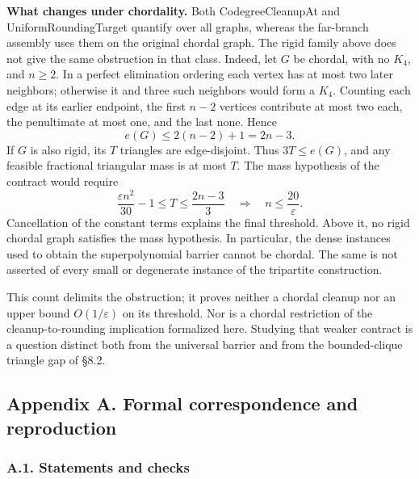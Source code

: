 \documentclass[english,11pt,a4paper]{article}
\newcounter{none}
\begin{document}
\textbf{What changes under chordality.} Both {\ttfamily\small CodegreeClea\discretionary{\hbox{\ensuremath{\hookrightarrow}}}{}{}nupAt} and {\ttfamily\small UniformRound\discretionary{\hbox{\ensuremath{\hookrightarrow}}}{}{}ingTarget} quantify over all graphs, whereas the far-branch assembly uses them on the original chordal graph. The rigid family above does not give the same obstruction in that class. Indeed, let \(G\) be chordal, with no \(K_4\), and \(n\ge2\). In a perfect elimination ordering each vertex has at most two later neighbors; otherwise it and three such neighbors would form a \(K_4\). Counting each edge at its earlier endpoint, the first \(n-2\) vertices contribute at most two each, the penultimate at most one, and the last none. Hence \[
e(G)\le2(n-2)+1=2n-3.
\tag{8.4}
\] If \(G\) is also rigid, its \(T\) triangles are edge-disjoint. Thus \(3T\le e(G)\), and any feasible fractional triangular mass is at most \(T\). The mass hypothesis of the contract would require \[
\frac{\varepsilon n^2}{30}-1
\le T\le\frac{2n-3}{3}
\quad\Longrightarrow\quad n\le\frac{20}{\varepsilon}.
\tag{8.5}
\] Cancellation of the constant terms explains the final threshold. Above it, no rigid chordal graph satisfies the mass hypothesis. In particular, the dense instances used to obtain the superpolynomial barrier cannot be chordal. The same is not asserted of every small or degenerate instance of the tripartite construction.

This count delimits the obstruction; it proves neither a chordal cleanup nor an upper bound \(O(1/\varepsilon)\) on its threshold. Nor is a chordal restriction of the cleanup-to-rounding implication formalized here. Studying that weaker contract is a question distinct both from the universal barrier and from the bounded-clique triangle gap of §8.2.

\subsection{Appendix A. Formal correspondence and reproduction}\label{appendix-a.-formal-correspondence-and-reproduction}

\subsubsection{A.1. Statements and checks}\label{a.1.-statements-and-checks}
\end{document}
